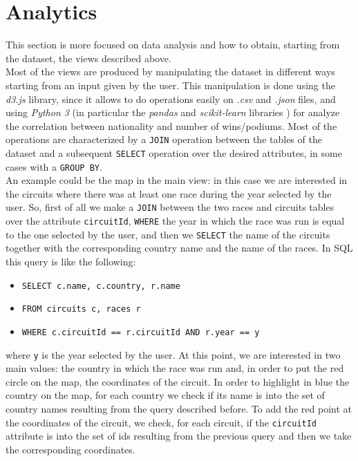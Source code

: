 \documentclass[11pt,twocolumn,letterpaper]{article}
\begin{document}
\section{Analytics}
This section is more focused on data analysis and how to obtain, starting from the dataset, the views described above.\\
Most of the views are produced by manipulating the dataset in different ways starting from an input given by the user. This manipulation is done using the \textit{d3.js} \cite{D3} library, since it allows to do operations easily on \textit{.csv} and \textit{.json} files, and using \textit{Python 3} (in particular the \textit{pandas} \cite{Pandas} and \textit{scikit-learn} libraries \cite{Scikit-learn}) for analyze the correlation between nationality and number of wins/podiums. Most of the operations are characterized by a \texttt{JOIN} operation between the tables of the dataset and a subsequent \texttt{SELECT} operation over the desired attributes, in some cases with a \texttt{GROUP BY}.\\
An example could be the map in the main view: in this case we are interested in the circuits where there was at least one race during the year selected by the user. So, first of all we make a \texttt{JOIN} between the two races and circuits tables over the attribute \texttt{circuitId}, \texttt{WHERE} the year in which the race was run is equal to the one selected by the user, and then we \texttt{SELECT} the name of the circuits together with the corresponding country name and the name of the races. In SQL this query is like the following:
\begin{itemize}
	\item \texttt{SELECT c.name, c.country, r.name}
	\item \texttt{FROM circuits c, races r}
	\item \texttt{WHERE c.circuitId == r.circuitId AND r.year == y}
\end{itemize}
where \texttt{y} is the year selected by the user.
At this point, we are interested in two main values: the country in which the race was run and, in order to put the red circle on the map, the coordinates of the circuit. In order to highlight in blue the country on the map, for each country we check if its name is into the set of country names resulting from the query described before. To add the red point at the coordinates of the circuit, we check, for each circuit, if the \texttt{circuitId} attribute is into the set of ids resulting from the previous query and then we take the corresponding coordinates.\\
\end{document}
